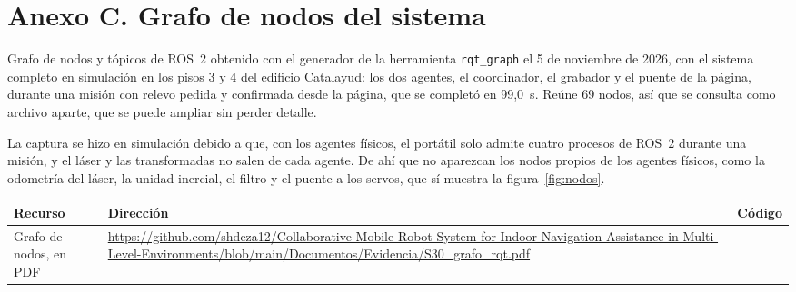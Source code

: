 \chapter*{Anexo C. Grafo de nodos del sistema}

Grafo de nodos y tópicos de ROS~2 obtenido con el generador de la herramienta \texttt{rqt\_graph} el 5 de noviembre de 2026, con el sistema completo en simulación en los pisos 3 y 4 del edificio Catalayud: los dos agentes, el coordinador, el grabador y el puente de la página, durante una misión con relevo pedida y confirmada desde la página, que se completó en 99,0~s. Reúne 69 nodos, así que se consulta como archivo aparte, que se puede ampliar sin perder detalle.

La captura se hizo en simulación debido a que, con los agentes físicos, el portátil solo admite cuatro procesos de ROS~2 durante una misión, y el láser y las transformadas no salen de cada agente. De ahí que no aparezcan los nodos propios de los agentes físicos, como la odometría del láser, la unidad inercial, el filtro y el puente a los servos, que sí muestra la figura~\ref{fig:nodos}.

\begin{table}[H]
  \centering\small
  \renewcommand{\arraystretch}{1.3}
  \begin{tabular}{@{}p{} p{} c@{}}
    \toprule
    \textbf{Recurso} & \textbf{Dirección} & \textbf{Código} \\ \midrule
    Grafo de nodos, en PDF & \url{https://github.com/shdeza12/Collaborative-Mobile-Robot-System-for-Indoor-Navigation-Assistance-in-Multi-Level-Environments/blob/main/Documentos/Evidencia/S30_grafo_rqt.pdf} & \raisebox{-0.85\height}{\qrcode[height=2cm]{https://github.com/shdeza12/Collaborative-Mobile-Robot-System-for-Indoor-Navigation-Assistance-in-Multi-Level-Environments/blob/main/Documentos/Evidencia/S30_grafo_rqt.pdf}} \\ \bottomrule
  \end{tabular}
\end{table}
